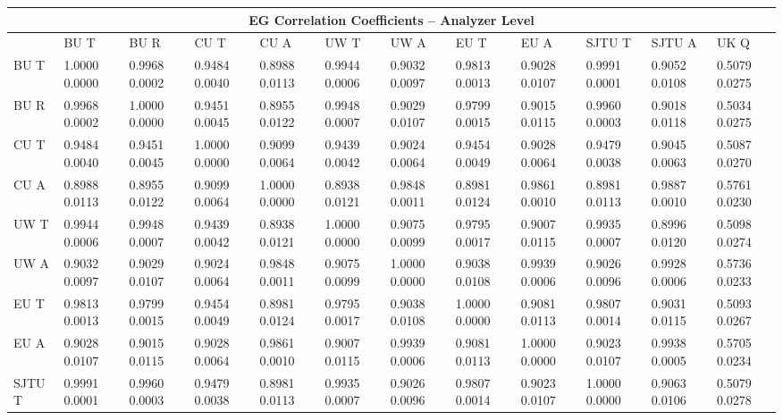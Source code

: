 \begin{landscape}
\begin{table}
\small
\centering
\renewcommand{\arraystretch}{1.5}
\begin{tabularx}{1\linewidth}{@{\extracolsep{\fill}}lXXXXXXXXXXX}
  \toprule
  	\multicolumn{12}{c}{{\normalsize EG Correlation Coefficients -- Analyzer Level}} \\
  \midrule
  	       & BU T & BU R & CU T & CU A & UW T & UW A & EU T & EU A & SJTU T & SJTU A & UK Q \\
  \midrule
	BU T   & 1.0000 0.0000 & 0.9968 0.0002 & 0.9484 0.0040 & 0.8988 0.0113 & 0.9944 0.0006 & 0.9032 0.0097 & 0.9813 0.0013 & 0.9028 0.0107 & 0.9991 0.0001 & 0.9052 0.0108 & 0.5079 0.0275  \\
	BU R   & 0.9968 0.0002 & 1.0000 0.0000 & 0.9451 0.0045 & 0.8955 0.0122 & 0.9948 0.0007 & 0.9029 0.0107 & 0.9799 0.0015 & 0.9015 0.0115 & 0.9960 0.0003 & 0.9018 0.0118 & 0.5034 0.0275  \\
	CU T   & 0.9484 0.0040 & 0.9451 0.0045 & 1.0000 0.0000 & 0.9099 0.0064 & 0.9439 0.0042 & 0.9024 0.0064 & 0.9454 0.0049 & 0.9028 0.0064 & 0.9479 0.0038 & 0.9045 0.0063 & 0.5087 0.0270  \\
	CU A   & 0.8988 0.0113 & 0.8955 0.0122 & 0.9099 0.0064 & 1.0000 0.0000 & 0.8938 0.0121 & 0.9848 0.0011 & 0.8981 0.0124 & 0.9861 0.0010 & 0.8981 0.0113 & 0.9887 0.0010 & 0.5761 0.0230  \\
	UW T   & 0.9944 0.0006 & 0.9948 0.0007 & 0.9439 0.0042 & 0.8938 0.0121 & 1.0000 0.0000 & 0.9075 0.0099 & 0.9795 0.0017 & 0.9007 0.0115 & 0.9935 0.0007 & 0.8996 0.0120 & 0.5098 0.0274  \\
	UW A   & 0.9032 0.0097 & 0.9029 0.0107 & 0.9024 0.0064 & 0.9848 0.0011 & 0.9075 0.0099 & 1.0000 0.0000 & 0.9038 0.0108 & 0.9939 0.0006 & 0.9026 0.0096 & 0.9928 0.0006 & 0.5736 0.0233  \\
	EU T   & 0.9813 0.0013 & 0.9799 0.0015 & 0.9454 0.0049 & 0.8981 0.0124 & 0.9795 0.0017 & 0.9038 0.0108 & 1.0000 0.0000 & 0.9081 0.0113 & 0.9807 0.0014 & 0.9031 0.0115 & 0.5093 0.0267  \\
	EU A   & 0.9028 0.0107 & 0.9015 0.0115 & 0.9028 0.0064 & 0.9861 0.0010 & 0.9007 0.0115 & 0.9939 0.0006 & 0.9081 0.0113 & 1.0000 0.0000 & 0.9023 0.0107 & 0.9938 0.0005 & 0.5705 0.0234  \\
	SJTU T & 0.9991 0.0001 & 0.9960 0.0003 & 0.9479 0.0038 & 0.8981 0.0113 & 0.9935 0.0007 & 0.9026 0.0096 & 0.9807 0.0014 & 0.9023 0.0107 & 1.0000 0.0000 & 0.9063 0.0106 & 0.5079 0.0278  \\

\end{tabularx}
\end{table}
\end{landscape}
